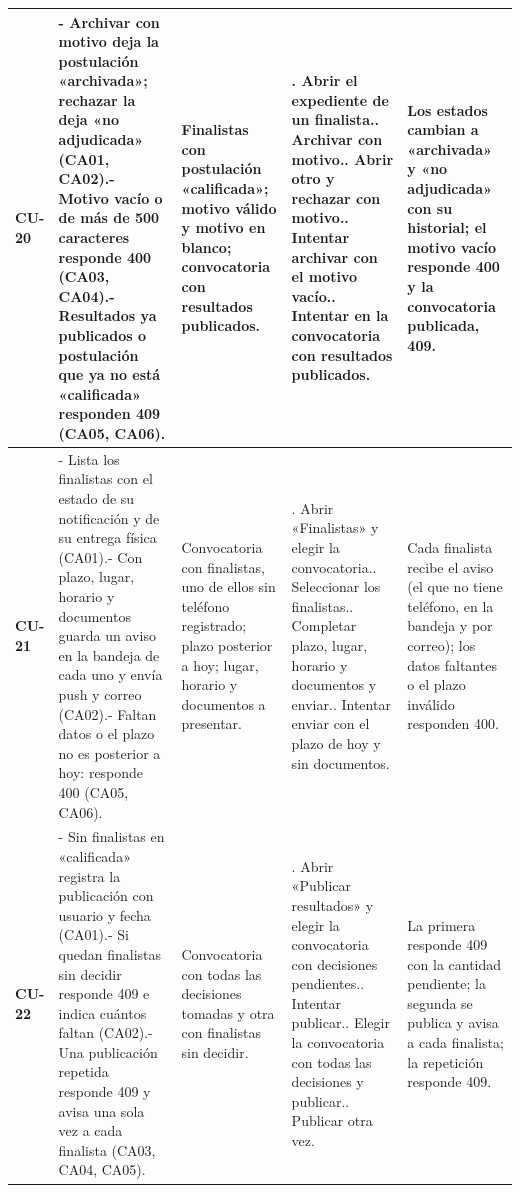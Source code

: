 {\begin{longtable}{@{}>{\raggedright\arraybackslash}p{1.2cm}>{\raggedright\arraybackslash}p{3.7cm}>{\raggedright\arraybackslash}p{3.0cm}>{\raggedright\arraybackslash}p{4.4cm}>{\raggedright\arraybackslash}p{3.4cm}@{}}
\midrule
\textbf{CU-20} & - Archivar con motivo deja la postulación «archivada»; rechazar la deja «no adjudicada» (CA01, CA02).\newline - Motivo vacío o de más de 500 caracteres responde 400 (CA03, CA04).\newline - Resultados ya publicados o postulación que ya no está «calificada» responden 409 (CA05, CA06). & Finalistas con postulación «calificada»; motivo válido y motivo en blanco; convocatoria con resultados publicados. & 1. Abrir el expediente de un finalista.\newline 2. Archivar con motivo.\newline 3. Abrir otro y rechazar con motivo.\newline 4. Intentar archivar con el motivo vacío.\newline 5. Intentar en la convocatoria con resultados publicados. & Los estados cambian a «archivada» y «no adjudicada» con su historial; el motivo vacío responde 400 y la convocatoria publicada, 409. \\
\midrule
\textbf{CU-21} & - Lista los finalistas con el estado de su notificación y de su entrega física (CA01).\newline - Con plazo, lugar, horario y documentos guarda un aviso en la bandeja de cada uno y envía push y correo (CA02).\newline - Faltan datos o el plazo no es posterior a hoy: responde 400 (CA05, CA06). & Convocatoria con finalistas, uno de ellos sin teléfono registrado; plazo posterior a hoy; lugar, horario y documentos a presentar. & 1. Abrir «Finalistas» y elegir la convocatoria.\newline 2. Seleccionar los finalistas.\newline 3. Completar plazo, lugar, horario y documentos y enviar.\newline 4. Intentar enviar con el plazo de hoy y sin documentos. & Cada finalista recibe el aviso (el que no tiene teléfono, en la bandeja y por correo); los datos faltantes o el plazo inválido responden 400. \\
\midrule
\textbf{CU-22} & - Sin finalistas en «calificada» registra la publicación con usuario y fecha (CA01).\newline - Si quedan finalistas sin decidir responde 409 e indica cuántos faltan (CA02).\newline - Una publicación repetida responde 409 y avisa una sola vez a cada finalista (CA03, CA04, CA05). & Convocatoria con todas las decisiones tomadas y otra con finalistas sin decidir. & 1. Abrir «Publicar resultados» y elegir la convocatoria con decisiones pendientes.\newline 2. Intentar publicar.\newline 3. Elegir la convocatoria con todas las decisiones y publicar.\newline 4. Publicar otra vez. & La primera responde 409 con la cantidad pendiente; la segunda se publica y avisa a cada finalista; la repetición responde 409. \\

\end{longtable}}
